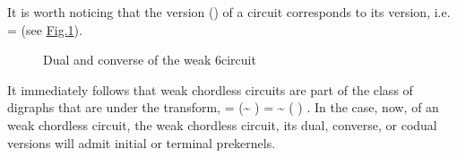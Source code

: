 \documentclass[a4paper,12pt,english]{sphinxhowto}
\let\sphinxpxdimen\pdfpxdimen\else\newdimen\sphinxpxdimen
\begin{document}
\begin{sphinxVerbatim}[commandchars=\\\{\},numbers=left,firstnumber=1,stepnumber=1]
   \PYG{p}{[}\PYG{p}{]}
\end{sphinxVerbatim}

It is worth noticing that the  version (\sphinxfootnotemark[14]) of a  circuit corresponds to its  version, i.e.  =  (see \hyperref[\detokenize{tutorial:weakchordlesscircuit}]{Fig.\@ \ref{\detokenize{tutorial:weakchordlesscircuit}}}).

\begin{sphinxVerbatim}[commandchars=\\\{\},numbers=left,firstnumber=1,stepnumber=1]
\end{sphinxVerbatim}

\begin{figure}[H]
\centering
\capstart

\noindent\sphinxincludegraphics[width=550\sphinxpxdimen]{{weakChordlessCircuit}.png}
\caption{Dual and converse of the weak 6\sphinxhyphen{}circuit}\label{\detokenize{tutorial:weakchordlesscircuit}}\end{figure}

It immediately follows that weak chordless circuits are part of the class of digraphs that are  under the  transform,  = \sphinxhyphen{} (\textasciitilde{}  ) = \textasciitilde{} ( \sphinxhyphen{} ) \sphinxfootnotemark[13]. In the case, now, of an  weak chordless circuit,  the weak chordless circuit,  its dual, converse, or codual versions will admit  initial or terminal prekernels.
\end{document}
